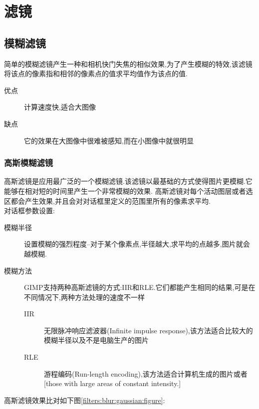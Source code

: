 \section{滤镜}
\subsection{模糊滤镜}
简单的模糊滤镜产生一种和相机快门失焦的相似效果,为了产生模糊的特效,该滤镜将该点的像素指和相邻的像素点的值求平均值作为该点的值.
\begin{description}
\item[优点]	计算速度快,适合大图像
\item[缺点]	它的效果在大图像中很难被感知,而在小图像中就很明显
\end{description}
\subsubsection{高斯模糊滤镜}\label{filters:blur:gaussian}
高斯滤镜是应用最广泛的一个模糊滤镜.该滤镜以最基础的方式使得图片更模糊.它能够在相对短的时间里产生一个非常模糊的效果.
高斯滤镜对每个活动图层或者选区都会产生效果,并且会对对话框里定义的范围里所有的像素求平均.\\
对话框参数设置:
\begin{description}
\item[模糊半径]	设置模糊的强烈程度--对于某个像素点,半径越大,求平均的点越多,图片就会越模糊.
\item[模糊方法]	GIMP支持两种高斯滤镜的方式:IIR和RLE.它们都能产生相同的结果,可是在不同情况下,两种方法处理的速度不一样
\begin{description}
\item[IIR]	无限脉冲响应滤波器(Infinite impulse response),该方法适合比较大的模糊半径以及不是电脑生产的图片
\item[RLE]	游程编码(Run-length encoding),该方法适合计算机生成的图片或者[those with large areas of constant intensity.]
\end{description}
\end{description}
高斯滤镜效果比对如下图\ref{filters:blur:gaussian:figure}:
